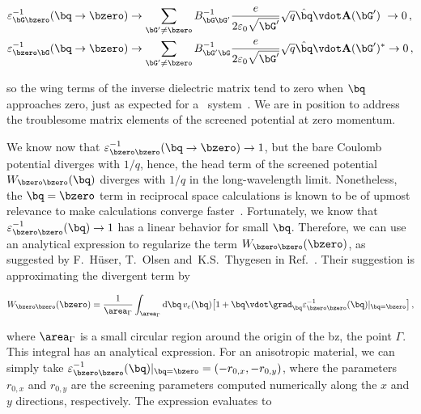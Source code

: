 \begin{align}
    &\varepsilon^{-1}_{\bG \bzero} (\bq \to \bzero) \to  \sum_{\bG' \neq \bzero}  B^{-1}_{\bG \bG'}   \frac{e}{2 \varepsilon_0 \sqrt{\bG'}} \sqrt{q} \hat{\bq} \vdot \mathbf{A}(\bG') \,\,\to 0 \,,\\
    &\varepsilon^{-1}_{\bzero \bG} (\bq \to \bzero) \to  \sum_{\bG' \neq \bzero}  B^{-1}_{\bG' \bG}  \frac{e}{2 \varepsilon_0 \sqrt{\bG'}} \sqrt{q} \hat{\bq} \vdot \mathbf{A}(\bG')^{*} \to 0 \,,
\end{align}

\noindent so the wing terms of the inverse dielectric matrix tend to zero when $\bq$ approaches zero, just as expected for a \bd~system~\cite{Guandalini_Varsano_2023}.
We are in position to address the troublesome matrix elements of the screened potential at zero momentum.

We know now that $\varepsilon^{-1}_{\bzero \bzero} (\bq \to \bzero) \to 1$, but the bare Coulomb potential diverges with $1/q$, hence, the head term of the screened potential $W_{\bzero \bzero} (\bq)$ diverges with $1/q$ in the long-wavelength limit.
Nonetheless, the $\bq = \bzero$ term in reciprocal space calculations is known to be of upmost relevance to make calculations converge faster~\cite{Rasmussen_Schmidt_Winther_Thygesen_2016}.
Fortunately, we know that $\varepsilon^{-1}_{\bzero \bzero} (\bq) \to 1$ has a linear behavior for small $\bq$.
Therefore, we can use an analytical expression to regularize the term $W_{\bzero \bzero} (\bzero)$, as suggested by F.~H\"user, T.~Olsen and~K.S.~Thygesen in Ref.~\cite{Huser_Olsen_Thygesen_2013}.
Their suggestion is approximating the divergent term by

\begin{equation}
    W_{\bzero \bzero} (\bzero) = \frac{1}{\area_{\Gamma}} \int_{\area_{\Gamma}} \mathrm{d} \bq \, v_c(\bq) \big[1 + \bq \vdot \mathbf{\grad}_{\bq} \varepsilon^{-1}_{\bzero \bzero} (\bq)|_{\bq = \bzero} \big] \,,
\end{equation}

\noindent where $\area_{\Gamma}$ is a small circular region around the origin of the \gls{bz}, the point $\Gamma$.
This integral has an analytical expression.
For an anisotropic material, we can simply take $\varepsilon^{-1}_{\bzero \bzero} (\bq)|_{\bq = \bzero} = (-r_{0,x},-r_{0,y})$, where the parameters $r_{0,x}$ and $r_{0,y}$ are the screening parameters computed numerically along the $x$ and $y$ directions, respectively.
The expression evaluates to

